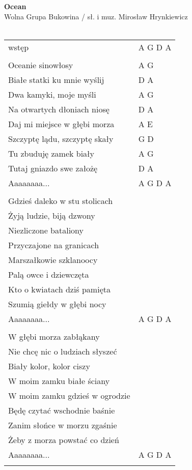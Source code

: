 \documentclass[a5paper]{article}
\begin{document}


\noindent
\fontsize{12pt}{15pt}\selectfont
\textbf{Ocean} \\
\fontsize{8pt}{10pt}\selectfont
Wolna Grupa Bukowina / sł. i muz. Mirosław Hrynkiewicz \\ \\
\fontsize{10pt}{12pt}\selectfont
{}
\begin{tabular}{@{}p{7.50cm}p{3cm}@{}}
\noindent
wstęp & A G D A \\ \\
Oceanie sinowłosy & A G \\
Białe statki ku mnie wyślij & D A \\
Dwa kamyki, moje myśli & A G \\
Na otwartych dłoniach niosę & D A \\
Daj mi miejsce w głębi morza & A E \\
Szczyptę lądu, szczyptę skały & G D \\
Tu zbuduję zamek biały & A G \\
Tutaj gniazdo swe założę & D A \\
  Aaaaaaaa...& A G D A \\ \\

Gdzieś daleko w stu stolicach \\
Żyją ludzie, biją dzwony \\
Niezliczone bataliony \\
Przyczajone na granicach \\
Marszałkowie szklanoocy \\
Palą owce i dziewczęta \\
Kto o kwiatach dziś pamięta \\
Szumią giełdy w głębi nocy \\
  Aaaaaaaa...& A G D A \\ \\
 
W głębi morza zabłąkany \\
Nie chcę nic o ludziach słyszeć \\
Biały kolor, kolor ciszy \\
W moim zamku białe ściany \\
W moim zamku gdzieś w ogrodzie \\
Będę czytać wschodnie baśnie \\
Zanim słońce w morzu zgaśnie \\
Żeby z morza powstać co dzień \\
  Aaaaaaaa...& A G D A \\ \\
 

\end{tabular}
\end{document}

